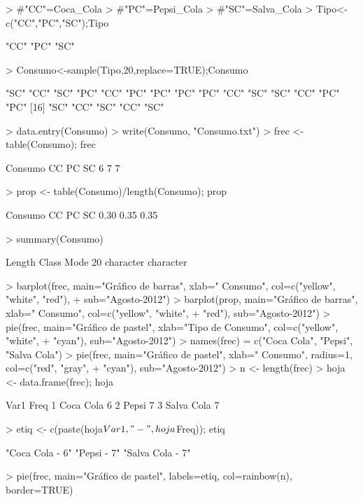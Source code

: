 \documentclass{article}
\begin{document}
\begin{Schunk}
\begin{Sinput}
> #"CC"=Coca_Cola
> #"PC"=Pepsi_Cola
> #"SC"=Salva_Cola
> Tipo<-c("CC","PC","SC");Tipo
\end{Sinput}
\begin{Soutput}
[1] "CC" "PC" "SC"
\end{Soutput}
\begin{Sinput}
> Consumo<-sample(Tipo,20,replace=TRUE);Consumo
\end{Sinput}
\begin{Soutput}
 [1] "SC" "CC" "SC" "PC" "CC" "PC" "PC" "PC" "PC" "CC" "SC" "SC" "CC" "PC" "PC"
[16] "SC" "CC" "SC" "CC" "SC"
\end{Soutput}
\begin{Sinput}
> data.entry(Consumo)
> write(Consumo, "Consumo.txt")
> frec <- table(Consumo); frec
\end{Sinput}
\begin{Soutput}
Consumo
CC PC SC 
 6  7  7 
\end{Soutput}
\begin{Sinput}
> prop <- table(Consumo)/length(Consumo); prop
\end{Sinput}
\begin{Soutput}
Consumo
  CC   PC   SC 
0.30 0.35 0.35 
\end{Soutput}
\begin{Sinput}
> summary(Consumo)
\end{Sinput}
\begin{Soutput}
   Length     Class      Mode 
       20 character character 
\end{Soutput}
\begin{Sinput}
> barplot(frec, main="Gráfico de barras", xlab=" Consumo", col=c("yellow", "white", "red"),
+ sub="Agosto-2012")
> barplot(prop, main="Gráfico de barras", xlab=" Consumo\n", col=c("yellow", "white",
+ "red"), sub="Agosto-2012")
> pie(frec, main="Gráfico de pastel", xlab="Tipo de Consumo", col=c("yellow", "white",
+ "cyan"), sub="Agosto-2012")
> names(frec) = c("Coca Cola", "Pepsi", "Salva Cola")
> pie(frec, main="Gráfico de pastel", xlab=" Consumo", radius=1, col=c("red", "gray",
+ "cyan"), sub="Agosto-2012")
> n <- length(frec)
> hoja <- data.frame(frec); hoja
\end{Sinput}
\begin{Soutput}
        Var1 Freq
1  Coca Cola    6
2      Pepsi    7
3 Salva Cola    7
\end{Soutput}
\begin{Sinput}
> etiq <- c(paste(hoja$Var1, "-", hoja$Freq)); etiq
\end{Sinput}
\begin{Soutput}
[1] "Coca Cola - 6"  "Pepsi - 7"      "Salva Cola - 7"
\end{Soutput}
\begin{Sinput}
> pie(frec, main="Gráfico de pastel", labels=etiq, col=rainbow(n), border=TRUE)
\end{Sinput}
\end{Schunk}
\end{document}
